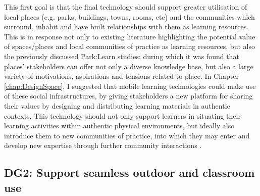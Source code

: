 This first goal is that the final technology should support greater utilisation of local places (e.g. parks, buildings, towns, rooms, etc) and the communities which surround, inhabit and have built relationships with them as learning resources. This is in response not only to existing literature highlighting the potential value of spaces/places \citep{Gryl2012, Frohberg2009} and local communities of practice \citep{Dodds2017, Leat2015} as learning resources, but also the previously discussed Park:Learn studies: during which it was found that places' stakeholders can offer not only a diverse knowledge base, but also a large variety of motivations, aspirations and tensions related to place. In Chapter \ref{chap:DesignSpace}, I suggested that mobile learning technologies could make use of these social infrastructures, by giving stakeholders a new platform for sharing their values by designing and distributing learning materials in authentic contexts. This technology should not only support learners in situating their learning activities within authentic physical environments, but ideally also introduce them to new communities of practice, into which they may enter and develop new expertise through further community interactions \citep{lave1991situated}.

\subsection*{ DG2: Support seamless outdoor and classroom use }
\label{DG2}

